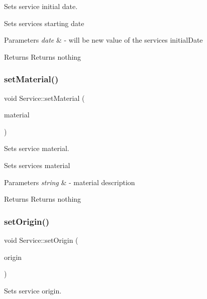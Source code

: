 Sets service initial date. 

Sets service\textquotesingle{}s starting date 
\begin{DoxyParams}{Parameters}
{\em date} & -\/ will be new value of the service\textquotesingle{}s initial\+Date \\
\hline
\end{DoxyParams}
\begin{DoxyReturn}{Returns}
Returns nothing 
\end{DoxyReturn}
\mbox{\label{class_service_a9fcafc3bcbdc0b436860ee5626c69ce1}} 
\subsubsection{\texorpdfstring{set\+Material()}{setMaterial()}}
{\footnotesize\ttfamily void Service\+::set\+Material (\begin{DoxyParamCaption}\item[{string}]{material }\end{DoxyParamCaption})}



Sets service material. 

Sets service\textquotesingle{}s material 
\begin{DoxyParams}{Parameters}
{\em string} & -\/ material description \\
\hline
\end{DoxyParams}
\begin{DoxyReturn}{Returns}
Returns nothing 
\end{DoxyReturn}
\mbox{\label{class_service_af3f248b1ecea5fd3fb0da198bfdbc7d5}} 
\subsubsection{\texorpdfstring{set\+Origin()}{setOrigin()}}
{\footnotesize\ttfamily void Service\+::set\+Origin (\begin{DoxyParamCaption}\item[{\hyperlink{class_address}{Address}}]{origin }\end{DoxyParamCaption})}



Sets service origin. 

